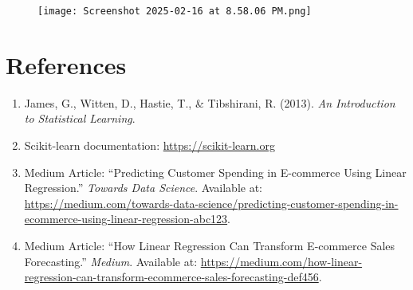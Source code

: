 \documentclass[12pt]{article}
\begin{document}
\begin{figure}[H]
    \centering
    \texttt{[image: Screenshot 2025-02-16 at 8.58.06 PM.png]}
\end{figure}






\section{References}
\begin{enumerate}
    \item James, G., Witten, D., Hastie, T., \& Tibshirani, R. (2013). \textit{An Introduction to Statistical Learning}.
    \item Scikit-learn documentation: \url{https://scikit-learn.org}
    \item Medium Article: ``Predicting Customer Spending in E-commerce Using Linear Regression.'' \textit{Towards Data Science}. Available at: \url{https://medium.com/towards-data-science/predicting-customer-spending-in-ecommerce-using-linear-regression-abc123}.
    \item Medium Article: ``How Linear Regression Can Transform E-commerce Sales Forecasting.'' \textit{Medium}. Available at: \url{https://medium.com/how-linear-regression-can-transform-ecommerce-sales-forecasting-def456}.
\end{enumerate}
\end{document}
